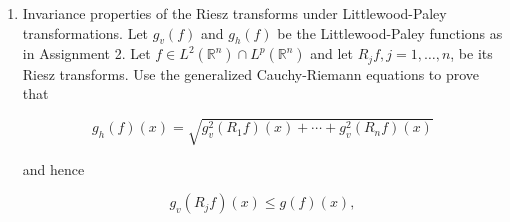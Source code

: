 \begin{enumerate}
\begin{proof}
	To prove (ii), first assume that $F$ is all zero after the $m$-th entry, that is, $f_j = 0$ for $j > m$. Then we can identify $F$ with a function in  $L^p(\mathbb{R}^n; \mathbb{R}^m)$.
	\begin{align*}
		\|\mathcal{T} F\|_p^p \int _{S^{m - 1}} \left| \xi_1 \right| ^p d \sigma(\xi)
		&= \int _{\mathbb{R}^n} |\mathcal{T}F|^p \int _{S^{m - 1}} \left| \xi_1 \right| ^p d \sigma(\xi) d x \\
		&= \int _{\mathbb{R}^n} \int _{S^{m - 1}} \left| \xi \cdot  \mathcal{T}F \right| ^p d \sigma(\xi) d x \\
		&=  \int _{S^{m - 1}}\int _{\mathbb{R}^n} \left| \xi \cdot  \mathcal{T}F \right| ^p  d x d \sigma(\xi)\\
		&\leq  \int _{S^{m - 1}} \|T\|^p \int _{\mathbb{R}^n} \left| \xi \cdot F \right| ^p  d x d \sigma(\xi)\\
		&=  \|T\|^p \int _{\mathbb{R}^n} \int _{S^{m - 1}} \left| \xi \cdot F \right| ^p  d \sigma(\xi)d x \\
		&=  \|T\|^p \int _{\mathbb{R}^n} \left| F \right| ^p \int _{S^{m - 1}} \left| \xi_1 \right| ^p  d \sigma(\xi)d x \\
		&=  \|T\|^p \|F\|_p^p \int _{S^{m - 1}} \left| \xi_1 \right| ^p  d \sigma(\xi)d x 
	.\end{align*}

	Finally, observe that the elements in $\ell^2$ with finitely meany nonzero entries form a dense subspace $\ell^2_{\text{fin}}$, where our inequality holds. That is, the operator $\mathcal{T}$ when restricted to $L^p(\mathbb{R}^n;\ell^2_{\text{fin}})$ is bounded with operator norm less than $\|T\|$. Thus $\mathcal{T}$ is bounded on $L^p(\mathbb{R}^n, \ell^2)$ with norm controlled by $\|T\|$.

\end{proof}

\item 
	Invariance properties of the Riesz transforms under Littlewood-Paley transformations. Let $g_v(f)$ and $g_h(f)$ be the Littlewood-Paley functions as in Assignment 2. Let $f \in L^2\left(\mathbb{R}^n\right) \cap L^p\left(\mathbb{R}^n\right)$ and let $R_j f, j=1, \ldots, n$, be its Riesz transforms. Use the generalized Cauchy-Riemann equations to prove that

\[
g_h(f)(x)=\sqrt{g_v^2\left(R_1 f\right)(x)+\cdots+g_v^2\left(R_n f\right)(x)}
\]

and hence

\[
g_v\left(R_j f\right)(x) \leq g(f)(x),
\]


\end{enumerate}
